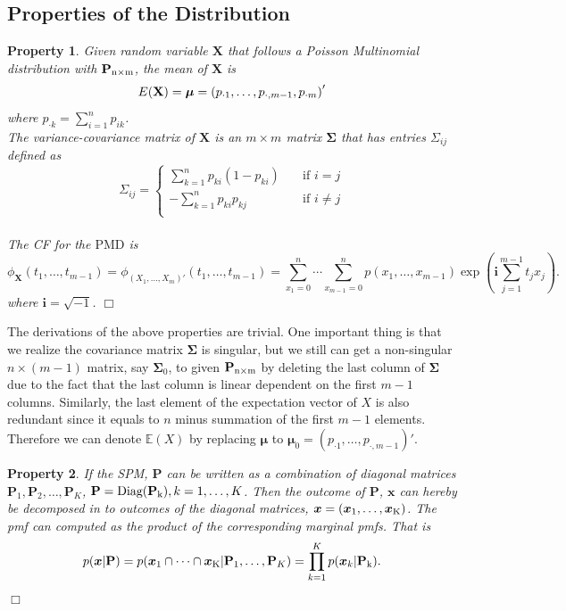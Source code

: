 \documentclass[12pt]{article}
\newcommand{\EE}{\mathbb{E}}
\newcommand{\Xmat}{\mathbf{X}}
\newcommand{\Pmat}{\mathbf{P}}
\newcommand{\ivec}{{\boldsymbol{i}}}
\newcommand{\diag}{\textrm{Diag}}
\newcommand{\PMD}{\textrm{PMD}}
\newcommand{\xvec}{\boldsymbol{x}}
\newcommand{\qedw}{\hfill \ensuremath{\Box}}
\newtheorem{ppt}{Property}
\begin{document}
\subsection{Properties of the Distribution}
\begin{ppt}\normalfont
Given random variable $\Xmat$ that follows a Poisson Multinomial distribution with $\Pmat_{\rm n\times m}$, the mean of $\Xmat$ is
   $$\\E(\Xmat) = \boldsymbol{\mu} = \left( p_{\cdot1} ,\dots,p_{\cdot,m-1},p_{\cdot m}\right)'$$ where $p_{\cdot k} = \sum_{i=1}^{n}p_{i k}$.\\
The variance-covariance matrix of $\Xmat$ is an $m \times m$ matrix $\boldsymbol{\Sigma}$ that has entries $\Sigma_{ij}$ defined as
\begin{equation*}
   \Sigma_{ij} =
           \begin{cases}
             \sum_{k=1}^{n}p_{ki}(1-p_{ki}) & \quad \text{if } i=j\\
             -\sum_{k=1}^{n}p_{ki}p_{kj} & \quad \text{if } i \neq j\\
           \end{cases}
\end{equation*}\\
The CF for the $\PMD$ is
\begin{equation*}
\phi_{\Xmat}(t_1, \dots, t_{m-1}) = \phi_{(X_1,\dots,X_m)'}(t_1, \dots, t_{m-1})  =  \sum_{x_1 = 0}^{n}\cdots \sum_{x_{m-1} = 0}^n p(x_1,\ldots,x_{m-1})\exp\left(\ivec\sum_{j=1}^{m-1}t_jx_j\right).
\end{equation*}
where  $\ivec=\sqrt{-1}$. 
\qedw
\end{ppt}
The derivations of the above properties are trivial. One important thing is that we realize the covariance matrix $\boldsymbol{\Sigma}$ is singular, but we still can get a non-singular $n \times (m-1)$ matrix, say $\boldsymbol{\Sigma}_{0}$, to given $\Pmat_{\rm n \times m}$ by deleting the last column of $\boldsymbol{\Sigma}$ due to the fact that the last column is linear dependent on the first $m-1$ columns. Similarly, the last element of the expectation vector of $X$ is also redundant since it equals to $n$ minus summation of the first $m-1$ elements. Therefore we can denote $\EE(X)$ by replacing $\boldsymbol{\mu}$ to $\boldsymbol{\mu}_0 = \left( p_{\cdot1} ,\dots,p_{\cdot,m-1}\right)'$.

\begin{ppt}\normalfont
If the SPM, $\Pmat$ can be written as a combination of diagonal matrices $\Pmat_1, \Pmat_2, \dots, \Pmat_{K}$, $\Pmat = \diag(\Pmat_{\rm k}), k=1,\dots,K$. Then the outcome of $\Pmat$, $\boldsymbol{x}$ can hereby be decomposed in to  outcomes of the diagonal matrices, $\xvec= (\xvec_{1},\dots,\xvec_{\rm K})$. The pmf can computed as the product of the corresponding marginal pmfs. That is
\begin{align*}
p(\xvec|\Pmat)= p(\xvec_{1} \cap \dots \cap \xvec_{\rm K}|\Pmat_1,\dots,\Pmat_{K} )= \prod_{k=1}^K p(\xvec_{k}|\Pmat_{\rm k}).
\end{align*}
\qedw
\end{ppt}
\end{document}

